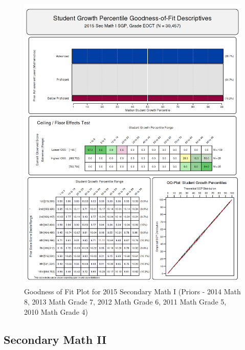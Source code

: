 \documentclass[12pt]{article}
\begin{document}
\begin{figure}[htbp]
\centering
\includegraphics{../img/Goodness_of_Fit/SEC_MATH_I.2015/2015_SEC_MATH_I_EOCT;2014_MATH_8;2013_MATH_7;2012_MATH_6;2011_MATH_5;2010_MATH_4.png}
\caption{Goodness of Fit Plot for 2015 Secondary Math I (Priors - 2014
Math 8, 2013 Math Grade 7, 2012 Math Grade 6, 2011 Math Grade 5, 2010
Math Grade 4)}
\end{figure}

\clearpage 

\subsection{Secondary Math II}\label{secondary-math-ii}
\end{document}
